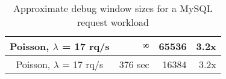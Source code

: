 \begin{table}[ht]
\begin{tabular}{|c|r|r|r|}
		Poisson, $\lambda$ = 17 rq/s                                        & $\infinity$                                                                                     & 65536                                                                           & 3.2x                                                                             \\ \hline
		Poisson, $\lambda$ = 17 rq/s                                        & 376 sec                                                                            & 16384                                                                           & 3.2x                                                                             \\ \hline
	\end{tabular}
\captionsetup{justification=centering}
\caption{Approximate debug window sizes for a MySQL request workload}
\label{table:timewindow}
\end{table}

